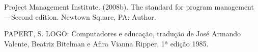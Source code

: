 \documentclass[
12pt,		%
openright,	%
twoside,  %
a4paper,			%
chapter=TITLE,		%
english,			%
french,				%
spanish,			%
brazil				%
]{USPSC-classe/USPSC}
\begin{document}
\begin{flushleft}
\begin{flushleft}
\begin{flushleft}
\begin{flushleft}
\begin{flushleft}
\begin{flushleft}
\begin{flushleft}
\begin{flushleft}
\begin{flushleft}
[PMI, 2008] Project Management Institute. (2008b). The standard for program management—Second edition. Newtown Square, PA: Author.
\end{flushleft}


\end{flushleft}


\end{flushleft}


\end{flushleft}


\end{flushleft}


\end{flushleft}


\end{flushleft}


\end{flushleft}


\end{flushleft}


\begin{flushleft}
\begin{flushleft}
\begin{flushleft}
\begin{flushleft}
\begin{flushleft}
\begin{flushleft}
\begin{flushleft}
\begin{flushleft}
\begin{flushleft}
[PAPERT, 1980] PAPERT, S. LOGO: Computadores e educa\c{c}\~ao, tradu\c{c}\~ao de Jos\'e Armando Valente, Beatriz Bitelman e Afira Vianna Ripper, 1ª edi\c{c}\~ao 1985.
\end{flushleft}


\end{flushleft}


\end{flushleft}


\end{flushleft}


\end{flushleft}


\end{flushleft}


\end{flushleft}


\end{flushleft}


\end{flushleft}
\end{document}
